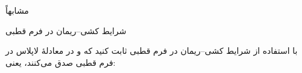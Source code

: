 \begin{EMunit}

مشابهاً


\end{EMunit}

\begin{EMimportant}{شرایط کشی--ریمان در فرم قطبی}


\end{EMimportant}

\begin{EMexercise}{}

با استفاده از شرایط کشی--ریمان در فرم قطبی ثابت کنید که  و  در معادلهٔ لاپلاس در فرم قطبی صدق می‌کنند، یعنی:

\end{EMexercise}
